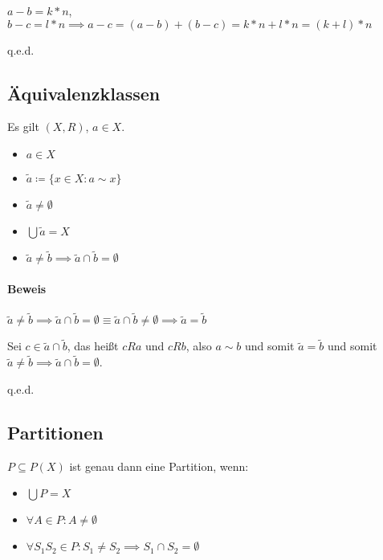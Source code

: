 \documentclass[12pt]{scrreprt}
\newcommand{\qed}{\begin{flushright}q.e.d.\end{flushright}}
\begin{document}
                    $ a - b = k * n $, $ b - c = l * n \implies a - c = (a - b) + (b - c) = k * n + l * n = (k + l) * n $

                    \qed


            \subsection{Äquivalenzklassen}
                \label{ss:grundbegriffe_mengen_aequivalenzklassen}

                Es gilt $ (X, R) $, $ a \in X $.

                \begin{itemize}
                    \item $ a \in X $
                    \item $ \tilde{a} \coloneqq \{ x \in X : a \sim x \} $
                    \item $ \tilde{a} \neq \emptyset $
                    \item $ \bigcup \tilde{a} = X $
                    \item $ \tilde{a} \neq \tilde{b} \implies \tilde{a} \cap \tilde{b} = \emptyset $
                \end{itemize}

                \paragraph{Beweis}
                    $ \tilde{a} \neq \tilde{b} \implies \tilde{a} \cap \tilde{b} = \emptyset \equiv \tilde{a} \cap \tilde{b} \neq \emptyset \implies \tilde{a} = \tilde{b} $

                    Sei $ c \in \tilde{a} \cap \tilde{b} $, das heißt $ cRa $ und $ cRb $, also $ a \sim b $ und somit $ \tilde{a} = \tilde{b} $ und somit $ \tilde{a} \neq \tilde{b} \implies \tilde{a} \cap \tilde{b} = \emptyset $.

                    \qed


            \subsection{Partitionen}
                \label{ss:grundbegriffe_mengen_partitionen}

                $ P \subseteq P(X) $ ist genau dann eine Partition, wenn:
                \begin{itemize}
                    \item $ \bigcup P = X $
                    \item $ \forall A \in P : A \neq \emptyset $
                    \item $ \forall S _ 1 S _ 2 \in P : S _ 1 \neq S _ 2 \implies S _ 1 \cap S _ 2 = \emptyset $
                \end{itemize}
\end{document}
